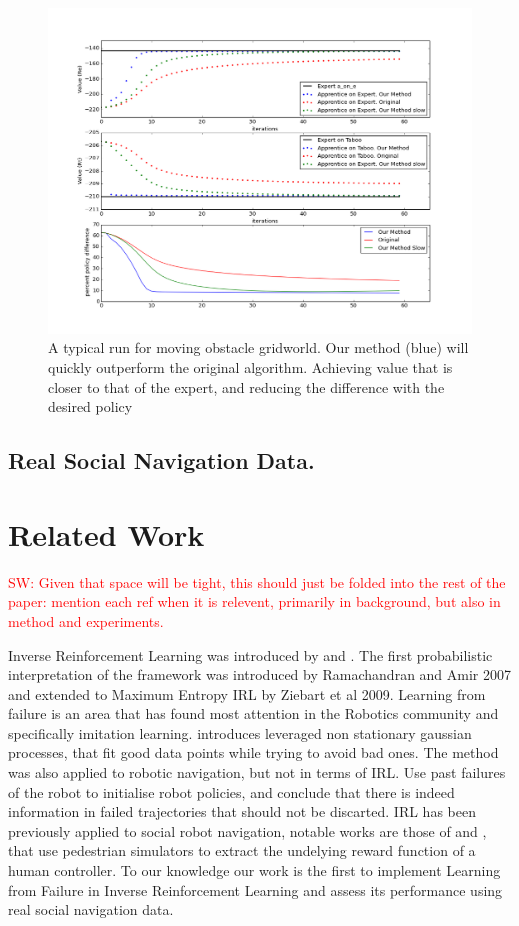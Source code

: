 \documentclass[letterpaper]{article}
\newcommand{\sw}[1]{\textcolor{red}{SW: #1}}
\begin{document}
\begin{figure}[t]
  \centering
  \includegraphics[width=0.9\columnwidth]{images/testgraph}
  \caption{A typical run for moving obstacle gridworld. Our method (blue) will quickly outperform the original algorithm. Achieving value that is closer to that of the expert, and reducing the difference with the desired policy\label{fig:results}}
\end{figure}

\subsection{Real Social Navigation Data.}




\section{Related Work}

\sw{Given that space will be tight, this should just be folded into the rest of the paper: mention each ref when it is relevent, primarily in background, but also in method and experiments.}

Inverse Reinforcement Learning was introduced by \cite{ng2000algorithms} and \cite{abbeel2004apprenticeship}. The first probabilistic interpretation of the framework was introduced by Ramachandran and Amir 2007 and extended to Maximum Entropy IRL by Ziebart et al 2009. 	Learning from failure is an area that has found most attention in the Robotics community and specifically imitation learning. \cite{choi2015} introduces leveraged non stationary gaussian processes, that fit good data points while trying to avoid bad ones. The method was also applied to robotic navigation, but not in terms of IRL. \cite{grollman2012robot} Use past failures of the robot to initialise robot policies, and conclude that there is indeed information in failed trajectories that should not be discarted. IRL has been previously applied to social robot navigation, notable works are those of \cite{henry2010learning} and \cite{vasquez2014inverse}, that use pedestrian simulators to extract the undelying reward function of a human controller. To our knowledge our work is the first to implement Learning from Failure in Inverse Reinforcement Learning and assess its performance using real social navigation data.
\end{document}
